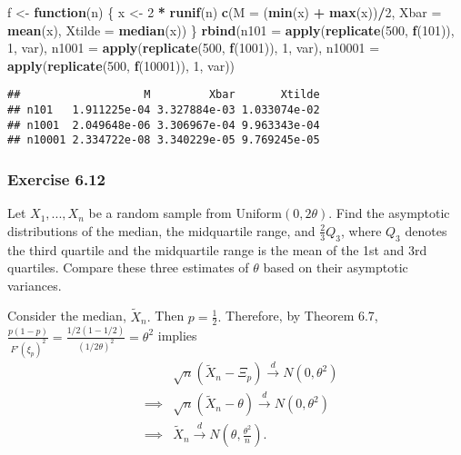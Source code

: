 \documentclass[12pt,]{article}
\newenvironment{Shaded}{\begin{snugshade}}{\end{snugshade}}
\newcommand{\ControlFlowTok}[1]{\textcolor[rgb]{0.13,0.29,0.53}{\textbf{#1}}}
\newcommand{\DataTypeTok}[1]{\textcolor[rgb]{0.13,0.29,0.53}{#1}}
\newcommand{\DecValTok}[1]{\textcolor[rgb]{0.00,0.00,0.81}{#1}}
\newcommand{\KeywordTok}[1]{\textcolor[rgb]{0.13,0.29,0.53}{\textbf{#1}}}
\newcommand{\NormalTok}[1]{#1}
\newcommand{\OperatorTok}[1]{\textcolor[rgb]{0.81,0.36,0.00}{\textbf{#1}}}
\newcommand{\StringTok}[1]{\textcolor[rgb]{0.31,0.60,0.02}{#1}}
\begin{document}
\begin{Shaded}
\begin{Highlighting}[]
\NormalTok{f <-}\StringTok{ }\ControlFlowTok{function}\NormalTok{(n) \{}
\NormalTok{    x <-}\StringTok{ }\DecValTok{2} \OperatorTok{*}\StringTok{ }\KeywordTok{runif}\NormalTok{(n)}
    \KeywordTok{c}\NormalTok{(}\DataTypeTok{M =}\NormalTok{ (}\KeywordTok{min}\NormalTok{(x) }\OperatorTok{+}\StringTok{ }\KeywordTok{max}\NormalTok{(x))}\OperatorTok{/}\DecValTok{2}\NormalTok{, }\DataTypeTok{Xbar =} \KeywordTok{mean}\NormalTok{(x), }\DataTypeTok{Xtilde =} \KeywordTok{median}\NormalTok{(x))}
\NormalTok{\}}
\KeywordTok{rbind}\NormalTok{(}\DataTypeTok{n101 =} \KeywordTok{apply}\NormalTok{(}\KeywordTok{replicate}\NormalTok{(}\DecValTok{500}\NormalTok{, }\KeywordTok{f}\NormalTok{(}\DecValTok{101}\NormalTok{)), }\DecValTok{1}\NormalTok{, var), }
    \DataTypeTok{n1001 =} \KeywordTok{apply}\NormalTok{(}\KeywordTok{replicate}\NormalTok{(}\DecValTok{500}\NormalTok{, }\KeywordTok{f}\NormalTok{(}\DecValTok{1001}\NormalTok{)), }\DecValTok{1}\NormalTok{, var), }
    \DataTypeTok{n10001 =} \KeywordTok{apply}\NormalTok{(}\KeywordTok{replicate}\NormalTok{(}\DecValTok{500}\NormalTok{, }\KeywordTok{f}\NormalTok{(}\DecValTok{10001}\NormalTok{)), }\DecValTok{1}\NormalTok{, var))}
\end{Highlighting}
\end{Shaded}

\begin{verbatim}
##                   M         Xbar       Xtilde
## n101   1.911225e-04 3.327884e-03 1.033074e-02
## n1001  2.049648e-06 3.306967e-04 9.963343e-04
## n10001 2.334722e-08 3.340229e-05 9.769245e-05
\end{verbatim}

\hypertarget{exercise-6.12}{%
\subsubsection{Exercise 6.12}\label{exercise-6.12}}

Let \(X_1,...,X_n\) be a random sample from Uniform\((0,2\theta)\). Find
the asymptotic distributions of the median, the midquartile range, and
\(\frac{2}{3}Q_3\), where \(Q_3\) denotes the third quartile and the
midquartile range is the mean of the 1st and 3rd quartiles. Compare
these three estimates of \(\theta\) based on their asymptotic variances.

Consider the median, \(\tilde X_n.\) Then \(p=\frac{1}{2}.\) Therefore,
by Theorem 6.7,
\(\frac{p(1-p)}{F'(\xi_p)^2}=\frac{1/2(1-1/2)}{(1/2\theta)^2}=\theta^2\)
implies \begin{align*}
&&\sqrt{n}(\tilde X_n - \Xi_p)\overset{d}\rightarrow N(0,\theta^2)\\
&\implies& \sqrt{n}(\tilde X_n-\theta)\overset{d}\rightarrow N(0,\theta^2)\\
&\implies& \tilde X_n \overset{d}\rightarrow N(\theta, \frac{\theta^2}{n}).
\end{align*}
\end{document}
